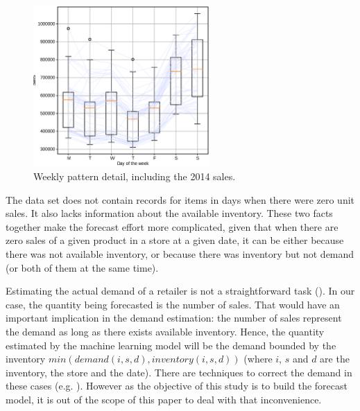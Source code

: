 \begin{figure}
	\centering
	\includegraphics[width=0.6\textwidth]{salesforecast/images/timeseries_dow}
	\caption{Weekly pattern detail, including the 2014 sales.}
	\label{fig:timeseries_detail}
\end{figure}

The data set does not contain records for items in days when there were zero unit sales. It also lacks information about the available inventory. These two facts together make the forecast effort more complicated, given that when there are zero sales of a given product in a store at a given date, it can be either because there was not available inventory, or because there was inventory but not demand (or both of them at the same time).

Estimating the actual demand of a retailer is not a straightforward task (\cite{Deep2019}). In our case, the quantity being forecasted is the number of sales. That would have an important implication in the demand estimation: the number of sales represent the demand as long as there exists available inventory. Hence, the quantity estimated by the machine learning model will be the demand bounded by the inventory $min(demand(i,s,d), inventory(i,s,d))$ (where $i$, $s$ and $d$ are the inventory, the store and the date). There are techniques to correct the demand in these cases (e.g. \cite{Bell2000}). However as the objective of this study is to build the forecast model, it is out of the scope of this paper to deal with that inconvenience.

